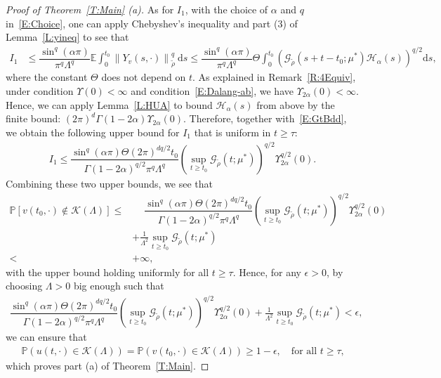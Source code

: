 \documentclass[sn-mathphys]{sn-jnl}%
\newcommand{\E}{\mathbb{E}}
\newcommand{\Norm}[1]{\left\| #1 \right\|}
\newcommand{\ud}{\ensuremath{\mathrm{d}}}
\numberwithin{equation}{section}
\theoremstyle{thmstyleone}%
\theoremstyle{thmstyletwo}%
\theoremstyle{thmstylethree}%
\begin{document}
\begin{proof}[Proof of Theorem~\ref{T:Main} (a)]
  As for $I_1$, with the choice of $\alpha$ and $q$ in~\eqref{E:Choice}, one can apply Chebyshev's
  inequality and part (3) of Lemma~\ref{L:yineq} to see that
  \begin{align*}
    I_1 & \le \dfrac{\sin^q (\alpha \pi)}{\pi^q \Lambda^q}\E \int_{0}^{t_0} \Norm{Y_v(s,\cdot)}_{\tilde{\rho}}^q \: \ud s
          \le \dfrac{\sin^q (\alpha \pi)}{\pi^q \Lambda^q} \Theta\int_0^{t_0}
          \left(\mathcal{G}_{\tilde{\rho}}(s + t-t_0;\mu^*) \mathcal{H}_{\alpha}(s)\right)^{q/2} \ud s,
  \end{align*}
  where the constant $\Theta$ does not depend on $t$. As explained in Remark~\ref{R:4Equiv}, under
  condition $\Upsilon(0)<\infty$ and condition~\eqref{E:Dalang-ab}, we have
  $\Upsilon_{2\alpha}(0)<\infty$. Hence, we can apply Lemma~\ref{L:HUA} to bound
  $\mathcal{H}_{\alpha}(s)$ from above by the finite bound: $\left(2\pi\right)^d \Gamma(1-2\alpha)
  \Upsilon_{2\alpha}(0)$. Therefore, together with~\eqref{E:GtBdd}, we obtain the following upper
  bound for $I_1$ that is uniform in $t\ge \tau$:
  \begin{align*}
    I_1 \le \dfrac{\sin^q (\alpha \pi)\Theta (2\pi)^{dq/2} t_0}{\Gamma\left(1-2\alpha\right)^{q/2}\pi^q \Lambda^q} \left(\sup_{t\ge t_0} \mathcal{G}_{\tilde{\rho}}\left(t;\mu^*\right)\right)^{q/2} \Upsilon_{2\alpha}^{q/2}(0).
  \end{align*}
  Combining these two upper bounds, we see that
  \begin{align*}
    \mathbb{P} \left[ v(t_0,\cdot) \not \in \mathscr{K}(\Lambda) \right ]
    \le & \phantom{+}\dfrac{\sin^q (\alpha \pi)\Theta (2\pi)^{dq/2} t_0}{\Gamma\left(1-2\alpha\right)^{q/2}\pi^q \Lambda^q} \left(\sup_{t\ge t_0} \mathcal{G}_{\tilde{\rho}}\left(t;\mu^*\right)\right)^{q/2} \Upsilon_{2\alpha}^{q/2}(0) \\
        & + \frac{1}{\Lambda^2} \sup_{t\ge t_0} \mathcal{G}_{\tilde{\rho}}\left(t;\mu^*\right)                                                                                                                                 \\
    <   & +\infty,
  \end{align*}
  with the upper bound holding uniformly for all $t\ge \tau$. Hence, for any $\epsilon>0$, by
  choosing $\Lambda > 0$ big enough such that
  \begin{align*}
    \dfrac{\sin^q (\alpha \pi)\Theta (2\pi)^{dq/2} t_0}{\Gamma\left(1-2\alpha\right)^{q/2}\pi^q \Lambda^q} \left(\sup_{t\ge t_0} \mathcal{G}_{\tilde{\rho}}\left(t;\mu^*\right)\right)^{q/2} \Upsilon_{2\alpha}^{q/2}(0)
    +
    \frac{1}{\Lambda^2} \sup_{t\ge t_0} \mathcal{G}_{\tilde{\rho}}\left(t;\mu^*\right)
    < \epsilon,
  \end{align*}
  we can ensure that
  \begin{align*}
      \mathbb{P}\left(u(t,\cdot) \in \mathscr{K}(\Lambda)\right)
    = \mathbb{P}\left(v(t_0,\cdot) \in \mathscr{K}(\Lambda)\right)
    \ge 1- \epsilon, \quad \text{for all $t\ge \tau$,}
  \end{align*}
  which proves part (a) of Theorem~\ref{T:Main}.
\end{proof}
\end{document}
